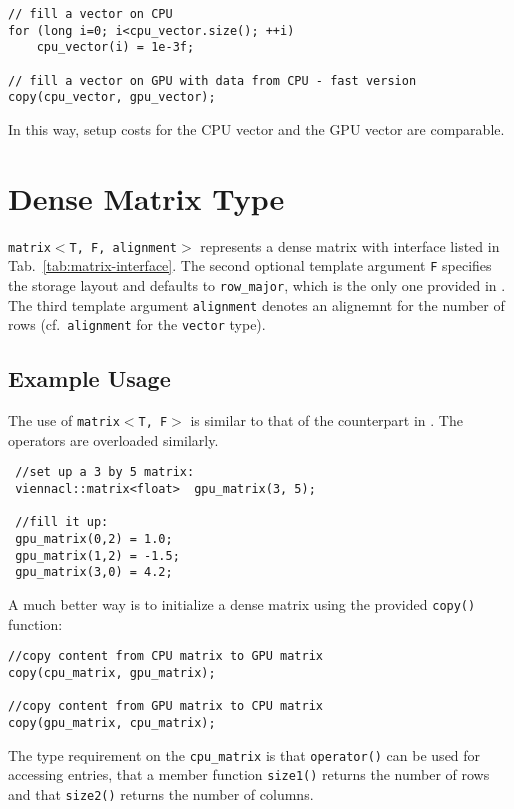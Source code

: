   \begin{lstlisting}
// fill a vector on CPU
for (long i=0; i<cpu_vector.size(); ++i)
    cpu_vector(i) = 1e-3f;

// fill a vector on GPU with data from CPU - fast version
copy(cpu_vector, gpu_vector);
\end{lstlisting} 
In this way, setup costs for the CPU vector and the GPU vector are comparable.

\section{Dense Matrix Type}
\texttt{matrix$<$T, F, alignment$>$} represents a dense matrix with interface listed in
Tab.~\ref{tab:matrix-interface}. The second optional template argument \texttt{F}
specifies the storage layout and defaults to \texttt{row\_major}, which is the only one provided in {\ViennaCLminorversion}.
The third template argument \texttt{alignment} denotes an alignemnt for the number of rows (cf.~\texttt{alignment} for the \texttt{vector} type).

\subsection{Example Usage}
The use of \texttt{matrix$<$T, F$>$} is similar to that of the counterpart in {\ublas}. The operators are overloaded similarly.

\begin{lstlisting}
 //set up a 3 by 5 matrix:
 viennacl::matrix<float>  gpu_matrix(3, 5);

 //fill it up:
 gpu_matrix(0,2) = 1.0; 
 gpu_matrix(1,2) = -1.5; 
 gpu_matrix(3,0) = 4.2; 
\end{lstlisting} 


A much better way is to initialize a dense matrix using the provided \texttt{copy()} function:
\begin{lstlisting}
//copy content from CPU matrix to GPU matrix
copy(cpu_matrix, gpu_matrix);

//copy content from GPU matrix to CPU matrix
copy(gpu_matrix, cpu_matrix);
\end{lstlisting} 
The type requirement on the \texttt{cpu\_matrix} is that \texttt{operator()} can be used for accessing entries, that a member function \texttt{size1()} returns the number of rows and that \texttt{size2()} returns the number of columns.

